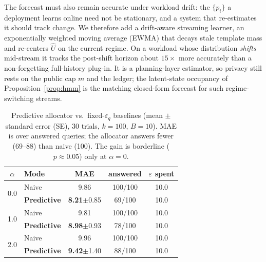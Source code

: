 \documentclass[sigconf,nonacm]{acmart}
\newcommand{\eps}{\varepsilon}
\begin{document}
The forecast must also remain accurate under workload drift: the $\{p_i\}$ a deployment learns online need not be stationary, and a system that re-estimates it should track change. We therefore add a drift-aware streaming learner, an exponentially weighted moving average (EWMA) that decays stale template mass and re-centers $\hat U$ on the current regime. On a workload whose distribution \emph{shifts} mid-stream it tracks the post-shift horizon about $15\times$ more accurately than a non-forgetting full-history plug-in. It is a planning-layer estimator, so privacy still rests on the public cap $m$ and the ledger; the latent-state occupancy of Proposition~\ref{prop:hmm} is the matching closed-form forecast for such regime-switching streams.

\begin{table}[h]
\footnotesize\centering
\caption{Predictive allocator vs.\ fixed-$\eps_q$ baselines (mean $\pm$ standard error (SE), 30 trials, $k{=}100$, $B{=}10$). MAE is over answered queries; the allocator answers fewer (69--88) than naive (100). The gain is borderline ($p\approx0.05$) only at $\alpha{=}0$.}
\label{tab:predictive}
\begin{tabular}{c|l|ccc}
\toprule
$\alpha$ & Mode & MAE & answered & $\eps$ spent \\
\midrule
\multirow{2}{*}{0.0} & Naive & 9.86 & 100/100 & 10.0 \\
 & \textbf{Predictive} & \textbf{8.21}$\pm$0.85 & 69/100 & 10.0 \\
\midrule
\multirow{2}{*}{1.0} & Naive & 9.81 & 100/100 & 10.0 \\
 & \textbf{Predictive} & \textbf{8.98}$\pm$0.93 & 78/100 & 10.0 \\
\midrule
\multirow{2}{*}{2.0} & Naive & 9.96 & 100/100 & 10.0 \\
 & \textbf{Predictive} & \textbf{9.42}$\pm$1.40 & 88/100 & 10.0 \\
\bottomrule
\end{tabular}
\end{table}
\end{document}
